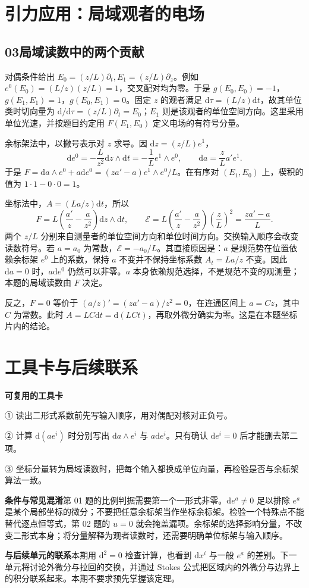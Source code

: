 \documentclass[11pt,a4paper]{article}
\newcommand{\D}{\mathrm d}
\newcommand{\head}[1]{\section*{\color{teal}#1}}
\begin{document}
\newpage
\head{引力应用：局域观者的电场}
\subsection*{03\quad 局域读数中的两个贡献}
对偶条件给出 $E_0=(z/L)\partial_t,E_1=(z/L)\partial_z$。例如 $e^0(E_0)=(L/z)(z/L)=1$，交叉配对均为零。于是 $g(E_0,E_0)=-1$，$g(E_1,E_1)=1$，$g(E_0,E_1)=0$。固定 $z$ 的观者满足 $\D\tau=(L/z)\D t$，故其单位类时切向量为 $\D/\D\tau=(z/L)\partial_t=E_0$；$E_1$ 则是该观者的单位空间方向。这里采用单位光速，并按题目约定用 $F(E_1,E_0)$ 定义电场的有符号分量。

余标架法中，以撇号表示对 $z$ 求导。因 $\D z=(z/L)e^1$，
\[
 \D e^0=-\frac L{z^2}\D z\wedge\D t=-\frac1L e^1\wedge e^0,
 \qquad \D a=\frac zL a' e^1 .
\]
于是 $F=\D a\wedge e^0+a\D e^0=(za'-a)e^1\wedge e^0/L$。在有序对 $(E_1,E_0)$ 上，楔积的值为 $1\cdot1-0\cdot0=1$。

坐标法中，$A=(La/z)\D t$，所以
\[
 F=L\left(\frac{a'}z-\frac a{z^2}\right)\D z\wedge\D t,
 \qquad \boxed{\mathcal E=L\left(\frac{a'}z-\frac a{z^2}\right)
 \left(\frac zL\right)^2=\frac{za'-a}L.}
\]
两个 $z/L$ 分别来自测量者的单位空间方向和单位时间方向。交换输入顺序会改变读数符号。若 $a=a_0$ 为常数，$\mathcal E=-a_0/L$。其直接原因是：$a$ 是规范势在位置依赖余标架 $e^0$ 上的系数，保持 $a$ 不变并不保持坐标系数 $A_t=La/z$ 不变。因此 $\D a=0$ 时，$a\D e^0$ 仍然可以非零。$a$ 本身依赖规范选择，不是规范不变的观测量；本题的局域读数由 $F$ 决定。

反之，$F=0$ 等价于 $(a/z)'=(za'-a)/z^2=0$，在连通区间上 $a=Cz$，其中 $C$ 为常数。此时 $A=LC\D t=\D(LCt)$，再取外微分确实为零。这是在本题坐标片内的结论。

\newpage
\head{工具卡与后续联系}

\textbf{可复用的工具卡}\par
① 读出二形式系数前先写输入顺序，用对偶配对核对正负号。\par
② 计算 $\D(a e^i)$ 时分别写出 $\D a\wedge e^i$ 与 $a\D e^i$。只有确认 $\D e^i=0$ 后才能删去第二项。\par
③ 坐标分量转为局域读数时，把每个输入都换成单位向量，再检验是否与余标架算法一致。

\textbf{条件与常见混淆}\quad 第 01 题的比例判据需要第一个一形式非零。$\D e^a\ne0$ 足以排除 $e^a$ 是某个局部坐标的微分；不要把任意余标架当作坐标余标架。检验一个特殊点不能替代逐点恒等式，第 02 题的 $u=0$ 就会掩盖漏项。余标架的选择影响分量，不改变二形式本身；将分量解释为观者读数时，还需要明确单位标架与输入顺序。

\textbf{与后续单元的联系}\quad 本期用 $\D^2=0$ 检查计算，也看到 $\D x^i$ 与一般 $e^a$ 的差别。下一单元将讨论外微分与拉回的交换，并通过 Stokes 公式把区域内的外微分与边界上的积分联系起来。本期不要求预先掌握该定理。
\end{document}
